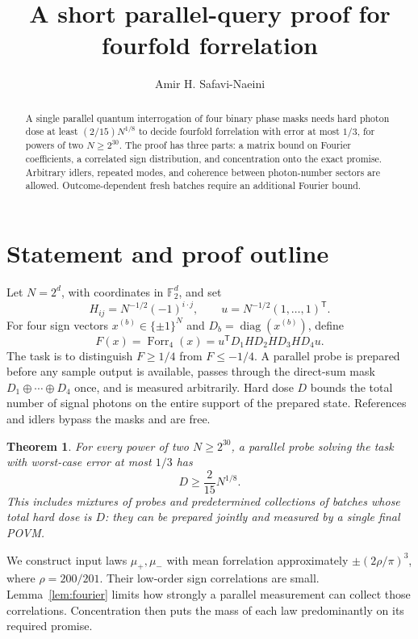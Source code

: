 \documentclass[11pt]{article}
\title{A short parallel-query proof for fourfold forrelation}
\author{Amir H. Safavi-Naeini}
\date{}
\newtheorem{theorem}{Theorem}
\newcommand{\diag}{\operatorname{diag}}
\begin{document}
\maketitle
\begin{abstract}
A single parallel quantum interrogation of four binary phase masks needs
hard photon dose at least $(2/15)N^{1/8}$ to decide fourfold forrelation
with error at most $1/3$, for powers of two $N\ge2^{30}$.
The proof has three parts: a matrix bound on Fourier coefficients,
a correlated sign distribution, and concentration onto the exact promise.
Arbitrary idlers, repeated modes, and coherence between photon-number
sectors are allowed. Outcome-dependent fresh batches require an
additional Fourier bound.
\end{abstract}

\section{Statement and proof outline}
Let $N=2^d$, with coordinates in $\mathbb F_2^d$, and set
\[
 H_{ij}=N^{-1/2}(-1)^{i\cdot j},\qquad
 u=N^{-1/2}(1,\ldots,1)^{\mathsf T}.
\]
For four sign vectors $x^{(b)}\in\{\pm1\}^N$ and
$D_b=\diag(x^{(b)})$, define
\[
 F(x)=\operatorname{Forr}_4(x)=u^{\mathsf T}D_1HD_2HD_3HD_4u .
\]
The task is to distinguish $F\ge1/4$ from $F\le-1/4$.
A parallel probe is prepared before any sample output is available,
passes through the direct-sum mask $D_1\oplus\cdots\oplus D_4$ once,
and is measured arbitrarily. Hard dose $D$ bounds the total number of
signal photons on the entire support of the prepared state.
References and idlers bypass the masks and are free.

\begin{theorem}\label{thm:main}
For every power of two $N\ge2^{30}$, a parallel probe solving the task
with worst-case error at most $1/3$ has
\[
                     D\ge\frac{2}{15}N^{1/8}.
\]
This includes mixtures of probes and predetermined collections of batches
whose total hard dose is $D$: they can be prepared jointly and measured
by a single final POVM.
\end{theorem}

We construct input laws $\mu_+,\mu_-$ with mean forrelation approximately
$\pm(2\rho/\pi)^3$, where $\rho=200/201$. Their low-order sign correlations
are small. Lemma~\ref{lem:fourier} limits how strongly a parallel
measurement can collect those correlations. Concentration then puts the
mass of each law predominantly on its required promise.
\end{document}
